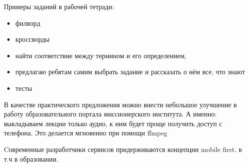 Примеры заданий в рабочей тетради:
\begin{itemize}
\item филворд
\item кроссворды
\item найти соответствие между термином и его определением,
\item предлагаю ребятам самим выбрать задание и рассказать о нём все, что знают
\item тесты
\end{itemize}

В качестве практического предложения можно внести небольшое улучшение в работу образовательного портала миссионерского института. А именно: выкладываем лекции только аудио, к ним будет проще получить доступ с телефона. Это делается мгновенно при помощи ffmpeg

Cовременные разработчики сервисов придерживаются концепции mobile first. в т.ч в образовании.